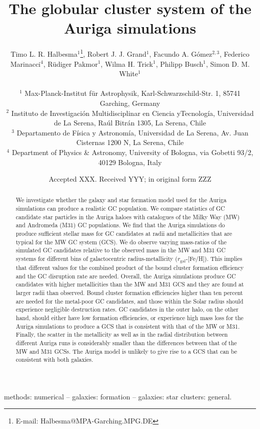 \documentclass[a4paper,fleqn,usenatbib]{mnras}
\title[Auriga GCS]{The globular cluster system of the Auriga simulations}
\author[T. L. R. Halbesma et al.]{\parbox[t]{\textwidth}{
    Timo L. R. Halbesma$^{1}$\thanks{E-mail: Halbesma@MPA-Garching.MPG.DE},
    Robert J. J. Grand$^{1}$,
    Facundo A. G\'{o}mez$^{2,3}$,
    Federico Marinacci$^{4}$,
    R\"{u}diger Pakmor$^{1}$,
    Wilma H. Trick$^{1}$,
    Philipp Busch$^{1}$,
    Simon D. M. White$^{1}$
} \vspace{10pt} \\
$^{1}$ Max-Planck-Institut f\"ur Astrophysik, Karl-Schwarzschild-Str. 1,
    85741 Garching, Germany \\
$^{2}$ Instituto de Investigaci\'{o}n Multidisciplinar en Ciencia yTecnolog\'{i}a,
    Universidad de La Serena, Ra\'{u}l Bitr\'{a}n 1305, La Serena, Chile \\
$^{3}$ Departamento de F\'{i}sica y Astronom\'{i}a, Universidad de La Serena, Av.
    Juan Cisternas 1200 N, La Serena, Chile \\
$^{4}$ Department of Physics \& Astronomy, University of Bologna, via Gobetti 93/2, 40129 Bologna, Italy \\
}
\date{Accepted XXX. Received YYY; in original form ZZZ}
\begin{document}
\label{firstpage}
\pagerange{\pageref{firstpage}--\pageref{lastpage}}
\maketitle

\begin{abstract}
We investigate whether the galaxy and star formation model used for the Auriga
simulations can produce a realistic GC population. We compare statistics of GC 
candidate star particles in the Auriga haloes with catalogues of the Milky Way 
(MW) and Andromeda (M31) GC populations. We find that the Auriga simulations do 
produce sufficient stellar mass for GC candidates at radii and metallicities that 
are typical for the MW GC system (GCS). We do observe varying mass-ratios of the
simulated GC candidates relative to the observed mass in the MW and M31 GC systems
for different bins of galactocentric radius-metallicity ($r_{\text{gal}}$-[Fe/H]).
This implies that different values for the combined product of the bound cluster 
formation efficiency and the GC disruption rate are needed. Overall, the Auriga 
simulations produce GC candidates with higher metallicities than the MW and M31 
GCS and they are found at larger radii than observed. Bound cluster formation
efficiencies higher than ten percent are needed for the metal-poor GC candidates,
and those within the Solar radius should experience negligible destruction rates.
GC candidates in the outer halo, on the other hand, should either have low formation
efficiencies, or experience high mass loss for the Auriga simulations to produce a
GCS that is consistent with that of the MW or M31. Finally, the scatter in the 
metallicity as well as in the radial distribution between different Auriga runs 
is considerably smaller than the differences between that of the MW and M31 GCSs. 
The Auriga model is unlikely to give rise to a GCS that can be consistent with
both galaxies.
\end{abstract}

\begin{keywords}
methods: numerical -- galaxies: formation -- galaxies: star clusters: general.
\end{keywords}


\end{document}
